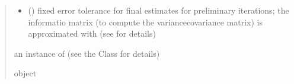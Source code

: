\documentclass[letterpaper,10pt,english]{sphinxmanual}
\begin{document}
\begin{fulllineitems}
\begin{quote}
\begin{description}
\begin{itemize}
\item {} 
\sphinxAtStartPar
{} () \textendash{} fixed error tolerance for final estimates for preliminary iterations;
the informatio matrix (to compute the variance\sphinxhyphen{}covariance matrix) is approximated with 
(see  for details)

\end{itemize}

\sphinxAtStartPar
an instance of  (see the Class for details)

\sphinxAtStartPar
object

\end{description}\end{quote}

\end{fulllineitems}

\end{document}
